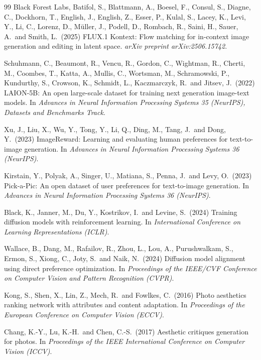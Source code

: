 \documentclass[10pt,twocolumn,letterpaper]{article}
\begin{document}
\begin{thebibliography}{99}
Black Forest Labs, Batifol, S., Blattmann, A., Boesel, F., Consul, S., Diagne, C., Dockhorn, T.,
English, J., English, Z., Esser, P., Kulal, S., Lacey, K., Levi, Y., Li, C., Lorenz, D.,
M\"uller, J., Podell, D., Rombach, R., Saini, H., Sauer, A.\ and Smith, L.\ (2025)
FLUX.1 Kontext: Flow matching for in-context image generation and editing in latent space.
{\it arXiv preprint arXiv:2506.15742}.

Schuhmann, C., Beaumont, R., Vencu, R., Gordon, C., Wightman, R., Cherti, M., Coombes, T.,
Katta, A., Mullis, C., Wortsman, M., Schramowski, P., Kundurthy, S., Crowson, K., Schmidt, L.,
Kaczmarczyk, R.\ and Jitsev, J.\ (2022)
LAION-5B: An open large-scale dataset for training next generation image-text models.
In {\it Advances in Neural Information Processing Systems 35 (NeurIPS), Datasets and Benchmarks Track}.

Xu, J., Liu, X., Wu, Y., Tong, Y., Li, Q., Ding, M., Tang, J.\ and Dong, Y.\ (2023)
ImageReward: Learning and evaluating human preferences for text-to-image generation.
In {\it Advances in Neural Information Processing Systems 36 (NeurIPS)}.

Kirstain, Y., Polyak, A., Singer, U., Matiana, S., Penna, J.\ and Levy, O.\ (2023)
Pick-a-Pic: An open dataset of user preferences for text-to-image generation.
In {\it Advances in Neural Information Processing Systems 36 (NeurIPS)}.

Black, K., Janner, M., Du, Y., Kostrikov, I.\ and Levine, S.\ (2024)
Training diffusion models with reinforcement learning.
In {\it International Conference on Learning Representations (ICLR)}.

Wallace, B., Dang, M., Rafailov, R., Zhou, L., Lou, A., Purushwalkam, S., Ermon, S., Xiong, C.,
Joty, S.\ and Naik, N.\ (2024)
Diffusion model alignment using direct preference optimization.
In {\it Proceedings of the IEEE/CVF Conference on Computer Vision and Pattern Recognition (CVPR)}.

Kong, S., Shen, X., Lin, Z., Mech, R.\ and Fowlkes, C.\ (2016)
Photo aesthetics ranking network with attributes and content adaptation.
In {\it Proceedings of the European Conference on Computer Vision (ECCV)}.

Chang, K.-Y., Lu, K.-H.\ and Chen, C.-S.\ (2017)
Aesthetic critiques generation for photos.
In {\it Proceedings of the IEEE International Conference on Computer Vision (ICCV)}.


\end{thebibliography}
\end{document}
